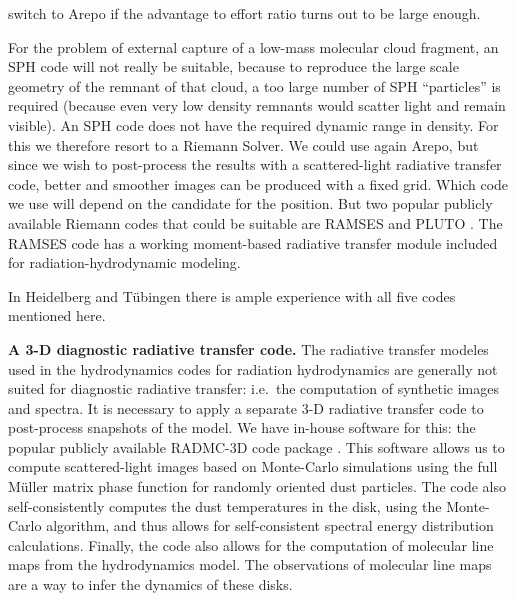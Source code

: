 \documentclass[10pt,fleqn,twoside]{article}
\begin{document}
\begin{compactenumerate}
\begin{compactitemize}
    switch to Arepo if the advantage to effort ratio turns out to be large
    enough.
  \item For the problem of external capture of a low-mass molecular cloud
    fragment, an SPH code will not really be suitable, because to reproduce
    the large scale geometry of the remnant of that cloud, a too large
    number of SPH ``particles'' is required (because even very low density
    remnants would scatter light and remain visible). An SPH code does not
    have the required dynamic range in density. For this we therefore resort
    to a Riemann Solver. We could use again Arepo, but since we wish to
    post-process the results with a scattered-light radiative transfer code,
    better and smoother images can be produced with a fixed grid. Which code
    we use will depend on the candidate for the position. But two popular
    publicly available Riemann codes that could be suitable are RAMSES
    \citep{2002A&A...385..337T} and PLUTO \citep{2007ApJS..170..228M}. The
    RAMSES code has a working moment-based radiative transfer module
    included for radiation-hydrodynamic modeling.
  \end{compactitemize}
  In Heidelberg and T\"ubingen there is ample experience with all five codes
  mentioned here. 
\item {\bf A 3-D diagnostic radiative transfer code.} The radiative transfer
  modeles used in the hydrodynamics codes for radiation hydrodynamics are
  generally not suited for diagnostic radiative transfer: i.e.\ the
  computation of synthetic images and spectra. It is necessary to apply a
  separate 3-D radiative transfer code to post-process snapshots of the
  model. We have in-house software for this: the popular publicly available
  RADMC-3D code package \citep{2012ascl.soft02015D}. This software allows us
  to compute scattered-light images based on Monte-Carlo simulations using
  the full M\"uller matrix phase function for randomly oriented dust
  particles.  The code also self-consistently computes the dust temperatures
  in the disk, using the \citet{2001ApJ...554..615B} Monte-Carlo algorithm,
  and thus allows for self-consistent spectral energy distribution
  calculations.  Finally, the code also allows for the computation of
  molecular line maps from the hydrodynamics model. The observations of
  molecular line maps are a way to infer the dynamics of these disks.
\end{compactenumerate}
\end{document}

